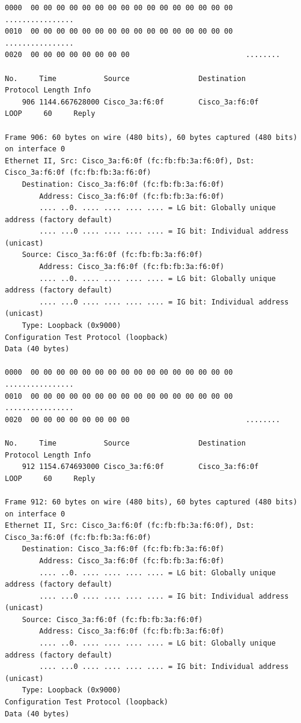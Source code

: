 \documentclass[a4paper,11pt]{article}
\begin{document}
\begin{lstlisting}
0000  00 00 00 00 00 00 00 00 00 00 00 00 00 00 00 00   ................
0010  00 00 00 00 00 00 00 00 00 00 00 00 00 00 00 00   ................
0020  00 00 00 00 00 00 00 00                           ........

No.     Time           Source                Destination           Protocol Length Info
    906 1144.667628000 Cisco_3a:f6:0f        Cisco_3a:f6:0f        LOOP     60     Reply

Frame 906: 60 bytes on wire (480 bits), 60 bytes captured (480 bits) on interface 0
Ethernet II, Src: Cisco_3a:f6:0f (fc:fb:fb:3a:f6:0f), Dst: Cisco_3a:f6:0f (fc:fb:fb:3a:f6:0f)
    Destination: Cisco_3a:f6:0f (fc:fb:fb:3a:f6:0f)
        Address: Cisco_3a:f6:0f (fc:fb:fb:3a:f6:0f)
        .... ..0. .... .... .... .... = LG bit: Globally unique address (factory default)
        .... ...0 .... .... .... .... = IG bit: Individual address (unicast)
    Source: Cisco_3a:f6:0f (fc:fb:fb:3a:f6:0f)
        Address: Cisco_3a:f6:0f (fc:fb:fb:3a:f6:0f)
        .... ..0. .... .... .... .... = LG bit: Globally unique address (factory default)
        .... ...0 .... .... .... .... = IG bit: Individual address (unicast)
    Type: Loopback (0x9000)
Configuration Test Protocol (loopback)
Data (40 bytes)

0000  00 00 00 00 00 00 00 00 00 00 00 00 00 00 00 00   ................
0010  00 00 00 00 00 00 00 00 00 00 00 00 00 00 00 00   ................
0020  00 00 00 00 00 00 00 00                           ........

No.     Time           Source                Destination           Protocol Length Info
    912 1154.674693000 Cisco_3a:f6:0f        Cisco_3a:f6:0f        LOOP     60     Reply

Frame 912: 60 bytes on wire (480 bits), 60 bytes captured (480 bits) on interface 0
Ethernet II, Src: Cisco_3a:f6:0f (fc:fb:fb:3a:f6:0f), Dst: Cisco_3a:f6:0f (fc:fb:fb:3a:f6:0f)
    Destination: Cisco_3a:f6:0f (fc:fb:fb:3a:f6:0f)
        Address: Cisco_3a:f6:0f (fc:fb:fb:3a:f6:0f)
        .... ..0. .... .... .... .... = LG bit: Globally unique address (factory default)
        .... ...0 .... .... .... .... = IG bit: Individual address (unicast)
    Source: Cisco_3a:f6:0f (fc:fb:fb:3a:f6:0f)
        Address: Cisco_3a:f6:0f (fc:fb:fb:3a:f6:0f)
        .... ..0. .... .... .... .... = LG bit: Globally unique address (factory default)
        .... ...0 .... .... .... .... = IG bit: Individual address (unicast)
    Type: Loopback (0x9000)
Configuration Test Protocol (loopback)
Data (40 bytes)


\end{lstlisting}
\end{document}
